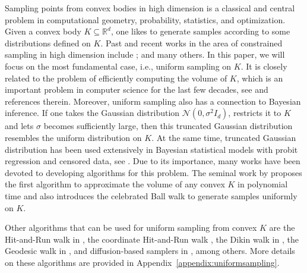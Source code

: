 \documentclass[11pt,letterpaper]{article}
\newcommand{\R}{\mathbb{R}}
\begin{document}
Sampling points from convex bodies in high dimension is a classical and central problem in computational geometry, probability, statistics, and optimization. Given a convex body $K\subseteq \R^d$, one likes to generate samples according to some distributions defined on $K$. Past and recent works in the area of constrained sampling in high dimension include \cite{lovasz1990mixing,cousins2018gaussian,kannan1997random,bubeck2018sampling,brosse2017sampling,kannan2009random,kook2024gaussian,girolami2011riemann,lee2018convergence,kook2023condition,gatmiry2023sampling,zhang2020wasserstein,jiang2021mirror,ahn2021efficient,li2022mirror,srinivasan2024fast,lehec2023langevin,gurbuzbalaban2024penalized,gopi2023algorithmic}; and many others.  In this paper, we will focus on the most fundamental case, i.e., uniform sampling on $K$. It is closely related to the problem of efficiently computing the volume of $K$, which is an important problem in computer science for the last few decades, see \cite{cousins2017efficient} and references therein. Moreover, uniform sampling also has a connection to Bayesian inference. If one takes the Gaussian distribution $\mathcal{N}(0,\sigma^2I_d)$, restricts it to $K$ and lets $\sigma$ becomes sufficiently large, then this truncated Gaussian distribution resembles the uniform distribution on $K$. At the same time, truncated Gaussian distribution has been used extensively in Bayesian statistical models with probit regression and censored data, see \cite{Held2006,albert1993bayesian,chib1992bayes,imai2005bayesian,tobin1958estimation}. Due to its importance, many works have been devoted to developing algorithms for this problem. The seminal work by \cite{dyer1991random} proposes the first algorithm to approximate the volume of any convex $K$ in polynomial time and also introduces the celebrated Ball walk to generate samples uniformly on $K$. 

Other algorithms that can be used for uniform sampling from convex $K$ are the Hit-and-Run walk in \cite{smith1984efficient,lovasz1993random,lovasz1999hit}, the coordinate Hit-and-Run walk \cite{turchin1971computation,diaconis2010gibbs,diaconis2012gibbs}, the Dikin walk in \cite{kannan2009random}, the Geodesic walk in \cite{lee2017geodesic}, and diffusion-based samplers in \cite{bubeck2018sampling,brosse2017sampling,gurbuzbalaban2024penalized,chalkis2023truncated}, among others. More details on these algorithms are provided in Appendix~\ref{appendix:uniformsampling}. 
\end{document}
